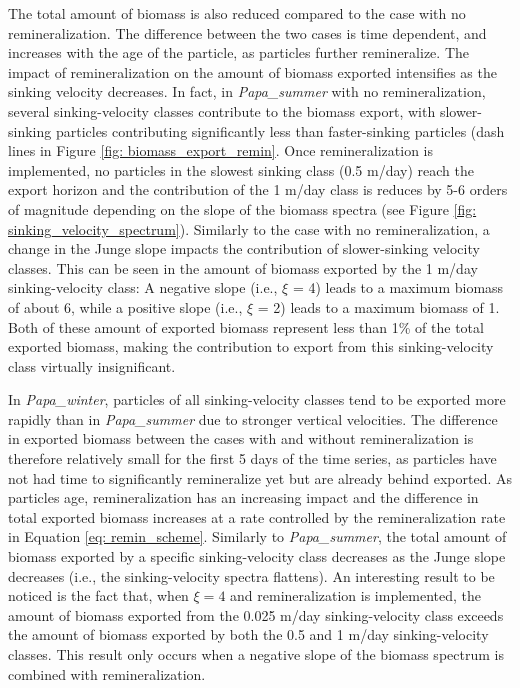 \documentclass[draft,linenumbers]{agujournal2018}
\begin{document}
 The total amount of biomass is also reduced compared to the case with no remineralization. The difference between the two cases is time dependent, and increases with the age of the particle, as particles further remineralize. The impact of remineralization on the amount of biomass exported intensifies as the sinking velocity decreases. In fact, in \textit{Papa\_summer} with no remineralization, several sinking-velocity classes contribute to the biomass export, with slower-sinking particles contributing significantly less than faster-sinking particles (dash lines in Figure \ref{fig: biomass_export_remin}. Once remineralization is implemented, no particles in the slowest sinking class (0.5 m/day) reach the export horizon and the contribution of the 1 m/day class is reduces by 5-6 orders of magnitude depending on the slope of the biomass spectra (see Figure \ref{fig: sinking_velocity_spectrum}). Similarly to the case with no remineralization, a change in the Junge slope impacts the contribution of slower-sinking velocity classes. This can be seen in the amount of biomass exported by the 1 m/day sinking-velocity class: A negative slope (i.e., $\xi$ = 4) leads to a maximum biomass of about 6, while a positive slope (i.e., $\xi$ = 2) leads to a maximum biomass of 1. Both of these amount of exported biomass represent less than 1\% of the total exported biomass, making the contribution to export from this sinking-velocity class virtually insignificant.
 
 In \textit{Papa\_winter}, particles of all sinking-velocity classes tend to be exported more rapidly than in \textit{Papa\_summer} due to stronger vertical velocities. The difference in exported biomass between the cases with and without remineralization is therefore relatively small for the first 5 days of the time series, as particles have not had time to significantly remineralize yet but are already behind exported. As particles age, remineralization has an increasing impact and the difference in total exported biomass increases at a rate controlled by the remineralization rate in Equation \ref{eq: remin_scheme}. Similarly to \textit{Papa\_summer}, the total amount of biomass exported by a specific sinking-velocity class decreases as the Junge slope decreases (i.e., the sinking-velocity spectra flattens). An interesting result to be noticed is the fact that, when $\xi = 4$ and remineralization is implemented, the amount of biomass exported from the 0.025 m/day sinking-velocity class exceeds the amount of biomass exported by both the 0.5 and 1 m/day sinking-velocity classes. This result only occurs when a negative slope of the biomass spectrum is combined with remineralization.
\end{document}
